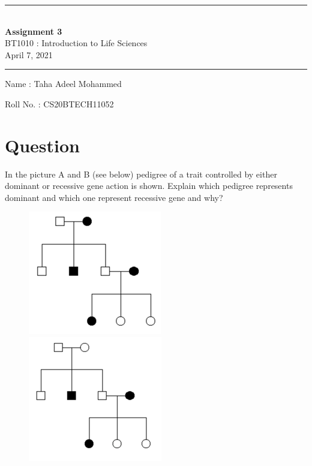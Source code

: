 \documentclass[12pt]{article}
\begin{document}
\begin{center}
\par\noindent\rule{\textwidth}{0.6pt}\\[0.3cm]
\textbf{\LARGE{Assignment 3}}\\[0.3cm]
\Large{BT1010 : Introduction to Life Sciences}\\[0.1cm]
\large{April 7, 2021}\\[0cm]
\par\noindent\rule{\textwidth}{0.6pt}
\end{center}
\noindent
\hspace{0.4cm}Name : Taha Adeel Mohammed
\par \noindent
\hspace{0.4cm}Roll No. : CS20BTECH11052
\section*{Question}
In the picture A and B (see below) pedigree of a trait controlled by either dominant or recessive gene action is shown. Explain which pedigree represents dominant and which one represent recessive gene and why?
\begin{figure}[h]
\centering
\begin{minipage}{.5\textwidth}
  \centering
  \includegraphics{Figures/Picture1_original.png}
  
\end{minipage}%
\begin{minipage}{.5\textwidth}
  \centering
  \includegraphics{Figures/Picture2_original.png}

\end{minipage}
\end{figure}
\end{document}

